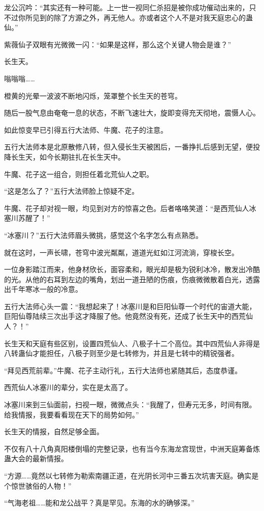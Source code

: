 \begin{this_body}
龙公沉吟：“其实还有一种可能。上一世一视同仁杀招是被你成功催动出来的，只不过你所见到的除了方源之外，再无他人。亦或者这个人不是对我天庭忠心的蛊仙。”

紫薇仙子双眼有光微微一闪：“如果是这样，那么这个关键人物会是谁？”

长生天。

嗡嗡嗡……

橙黄的光晕一波波不断地闪烁，笼罩整个长生天的苍穹。

随后一股气息由奄奄一息的状态，不断飞速壮大，旋即变得充天彻地，震慑人心。

如此惊变早已引得五行大法师、牛魔、花子的注意。

五行大法师本是北原散修八转，但入侵长生天被困后，一番挣扎后感到无望，便投降长生天，如今长期驻扎在长生天中。

牛魔、花子这一组合，则担任着北荒仙人之职。

“这是怎么了？”五行大法师脸上惊疑不定。

牛魔、花子却对视一眼，均见到对方的惊喜之色。后者咯咯笑道：“是西荒仙人冰塞川苏醒了！”

“冰塞川？”五行大法师眉头微挑，感觉这个名字怎么有点熟悉。

就在这时，一声长啸，苍穹中波光粼粼，道道光虹如江河流淌，穿梭长空。

一位身影踏江而来，他身材欣长，面容柔和，眼光却是极为锐利冰冷，散发出冷酷的光。从他的右耳到左边的嘴角，划出一道丑陋的伤痕，伤痕微微散着白光，透露出千年寒冰一般的冷意。

五行大法师心头一震：“我想起来了！冰塞川是和巨阳仙尊一个时代的宙道大能，巨阳仙尊陆续三次出手这才降服了他。他竟然没有死，还成了长生天中的西荒仙人？！”

长生天和天庭有些区别，设置四荒仙人、八极子十二个高位。其中四荒仙人非得是八转蛊仙才能担任，八极子则至少是七转修为，并且是七转中的精锐强者。

“拜见西荒前辈。”牛魔、花子主动行礼，五行大法师也紧随其后，态度恭谨。

西荒仙人冰塞川的辈分，实在是太高了。

冰塞川来到三仙面前，扫视一眼，微微点头：“我醒了，但寿元无多，时间有限。给我情报，我要看看现在天下的局势如何。”

长生天的情报，自然足够全面。

不仅有八十八角真阳楼倒塌的完整记录，也有当今东海龙宫现世，中洲天庭筹备炼蛊大会的最新情报。

“方源……竟然以七转修为勒索南疆正道，在光阴长河中三番五次坑害天庭。确实是个惊世骇俗的人物！”

“气海老祖……能和龙公战平？真是罕见。东海的水的确够深。”


\end{this_body}
